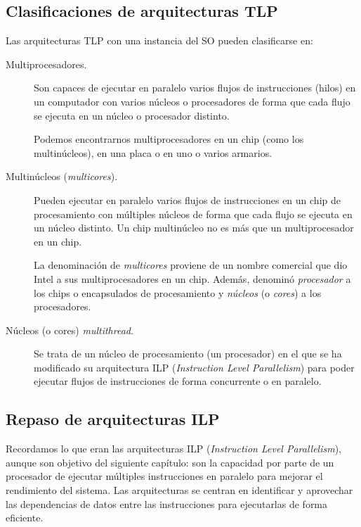 \subsection{Clasificaciones de arquitecturas TLP}
Las arquitecturas TLP con una instancia del SO pueden clasificarse en:
\begin{description}
    \item [Multiprocesadores.] Son capaces de ejecutar en paralelo varios flujos de instrucciones (hilos) en un computador con varios núcleos o procesadores de forma que cada flujo se ejecuta en un núcleo o procesador distinto. 

        Podemos encontrarnos multiprocesadores en un chip (como los multinúcleos), en una placa o en uno o varios armarios.
    \item [Multinúcleos (\emph{multicores}).] Pueden ejecutar en paralelo varios flujos de instrucciones en un chip de procesamiento con múltiples núcleos de forma que cada flujo se ejecuta en un núcleo distinto. Un chip multinúcleo no es más que un multiprocesador en un chip. 

        La denominación de \emph{multicores} proviene de un nombre comercial que dio Intel a sus multiprocesadores en un chip. Además, denominó \emph{procesador} a los chips o encapsulados de procesamiento y \emph{núcleos} (o \emph{cores}) a los procesadores.
    \item [Núcleos (o cores) \emph{multithread}.] Se trata de un núcleo de procesamiento (un procesador) en el que se ha modificado su arquitectura ILP (\emph{Instruction Level Parallelism}) para poder ejecutar flujos de instrucciones de forma concurrente o en paralelo.
\end{description}

\subsection{Repaso de arquitecturas ILP}\label{subsec:repaso_ILP}
Recordamos lo que eran las arquitecturas ILP (\emph{Instruction Level Parallelism}), aunque son objetivo del siguiente capítulo: son la capacidad por parte de un procesador de ejecutar múltiples instrucciones en paralelo para mejorar el rendimiento del sistema. Las arquitecturas se centran en identificar y aprovechar las dependencias de datos entre las instrucciones para ejecutarlas de forma eficiente.

